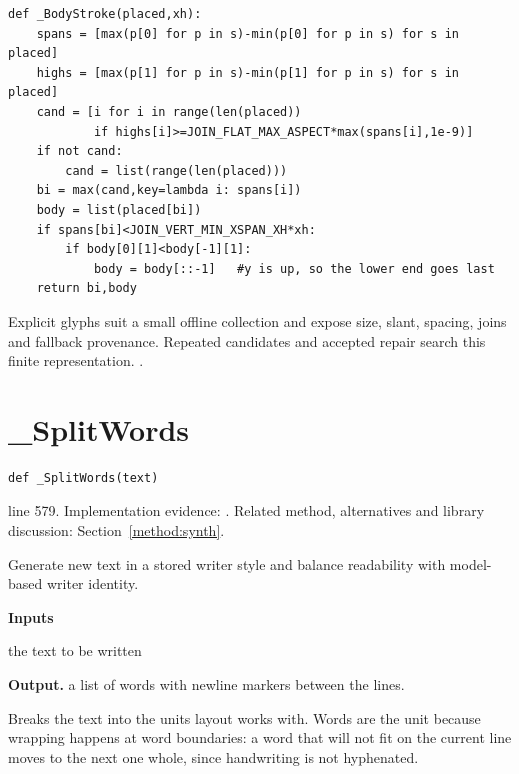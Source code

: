 \begin{lstlisting}[style=plain]
def _BodyStroke(placed,xh):
    spans = [max(p[0] for p in s)-min(p[0] for p in s) for s in placed]
    highs = [max(p[1] for p in s)-min(p[1] for p in s) for s in placed]
    cand = [i for i in range(len(placed))
            if highs[i]>=JOIN_FLAT_MAX_ASPECT*max(spans[i],1e-9)]
    if not cand:
        cand = list(range(len(placed)))
    bi = max(cand,key=lambda i: spans[i])
    body = list(placed[bi])
    if spans[bi]<JOIN_VERT_MIN_XSPAN_XH*xh:
        if body[0][1]<body[-1][1]:
            body = body[::-1]   #y is up, so the lower end goes last
    return bi,body
\end{lstlisting}
Explicit glyphs suit a small offline collection and expose size, slant, spacing, joins and fallback provenance. Repeated candidates and accepted repair search this finite representation. \cite{haines2016,gravesgenerate,ganwriting,onedm}.


\section{\_SplitWords}\label{fn:synthesise:-SplitWords}
\begin{lstlisting}[style=sig]
def _SplitWords(text)
\end{lstlisting}
 line 579. Implementation evidence: \cite{code2026}. Related method, alternatives and library discussion: Section~\ref{method:synth}.


Generate new text in a stored writer style and balance readability with model-based writer identity.




\noindent\textbf{Inputs}
\begin{description}[leftmargin=2.2em,style=nextline,font=\normalfont\ttfamily]\setlength\itemsep{1pt}
  \item[{text}] \normalfont the text to be written
\end{description}

\noindent\textbf{Output.} a list of words with newline markers between the lines.


Breaks the text into the units layout works with. Words are the unit because wrapping happens at word boundaries: a word that will not fit on the current line moves to the next one whole, since handwriting is not hyphenated.


